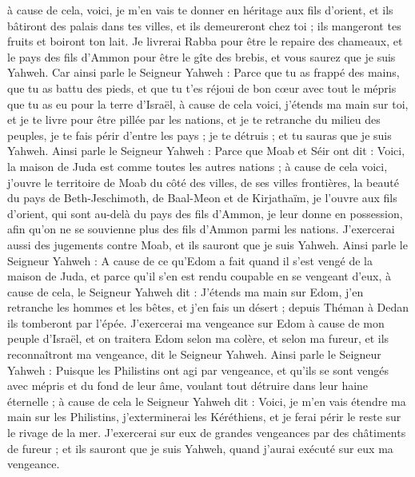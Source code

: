 \begin{multicols}{2}
à cause de cela, voici, je m'en vais te donner en héritage aux fils d'orient, et ils bâtiront des palais dans tes villes, et ils demeureront chez toi ; ils mangeront tes fruits et boiront ton lait.
Je livrerai Rabba pour être le repaire des chameaux, et le pays des fils d'Ammon pour être le gîte des brebis, et vous saurez que je suis Yahweh.
Car ainsi parle le Seigneur Yahweh : Parce que tu as frappé des mains, que tu as battu des pieds, et que tu t'es réjoui de bon cœur avec tout le mépris que tu as eu pour la terre d'Israël,
à cause de cela voici, j'étends ma main sur toi, et je te livre pour être pillée par les nations, et je te retranche du milieu des peuples, je te fais périr d'entre les pays ; je te détruis ; et tu sauras que je suis Yahweh.
Ainsi parle le Seigneur Yahweh : Parce que Moab et Séir ont dit : Voici, la maison de Juda est comme toutes les autres nations ;
à cause de cela voici, j'ouvre le territoire de Moab du côté des villes, de ses villes frontières, la beauté du pays de Beth-Jeschimoth, de Baal-Meon et de Kirjathaïm,
je l'ouvre aux fils d'orient, qui sont au-delà du pays des fils d'Ammon, je leur donne en possession, afin qu'on ne se souvienne plus des fils d'Ammon parmi les nations.
J'exercerai aussi des jugements contre Moab, et ils sauront que je suis Yahweh.
Ainsi parle le Seigneur Yahweh : A cause de ce qu'Edom a fait quand il s'est vengé de la maison de Juda, et parce qu'il s'en est rendu coupable en se vengeant d'eux,
à cause de cela, le Seigneur Yahweh dit : J'étends ma main sur Edom, j'en retranche les hommes et les bêtes, et j'en fais un désert ; depuis Théman à Dedan ils tomberont par l'épée.
J'exercerai ma vengeance sur Edom à cause de mon peuple d'Israël, et on traitera Edom selon ma colère, et selon ma fureur, et ils reconnaîtront ma vengeance, dit le Seigneur Yahweh.
Ainsi parle le Seigneur Yahweh : Puisque les Philistins ont agi par vengeance, et qu'ils se sont vengés avec mépris et du fond de leur âme, voulant tout détruire dans leur haine éternelle ;
à cause de cela le Seigneur Yahweh dit : Voici, je m'en vais étendre ma main sur les Philistins, j'exterminerai les Kéréthiens, et je ferai périr le reste sur le rivage de la mer.
J'exercerai sur eux de grandes vengeances par des châtiments de fureur ; et ils sauront que je suis Yahweh, quand j'aurai exécuté sur eux ma vengeance.

\end{multicols}

